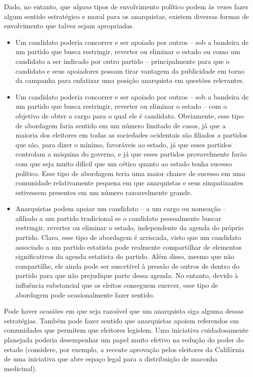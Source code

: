 Dado, no entanto, que \emph{alguns} tipos de envolvimento político podem às vezes fazer algum sentido estratégico e moral para os anarquistas, existem diversas formas de envolvimento que talvez sejam apropriadas.

\begin{itemize}
\item Um candidato poderia concorrer e ser apoiado por outros -- sob a bandeira de um partido que busca restringir, reverter ou eliminar o estado ou como um candidato a ser indicado por outro partido -- principalmente para que o candidato e seus apoiadores possam tirar vantagem da publicidade em torno da campanha para enfatizar uma posição anarquista em questões relevantes.

\item Um candidato poderia concorrer e ser apoiado por outros -- sob a bandeira de um partido que busca restringir, reverter ou eliminar o estado -- com o objetivo de obter o cargo para o qual ele é candidato. Obviamente, esse tipo de abordagem faria sentido em um número limitado de casos, já que a maioria dos eleitores em todas as sociedades ocidentais são filiados a partidos que são, para dizer o mínimo, favoráveis ao estado, já que esses partidos controlam a máquina do governo, e já que esses partidos provavelmente farão com que seja muito difícil que um cético quanto ao estado tenha sucesso político. Esse tipo de abordagem teria uma maior chance de sucesso em uma comunidade relativamente pequena em que anarquistas e seus simpatizantes estivessem presentes em um número razoavelmente grande.

\item Anarquistas podem apoiar um candidato -- a um cargo ou nomeação -- afiliado a um partido tradicional se o candidato pessoalmente buscar restringir, reverter ou eliminar o estado, independente da agenda do próprio partido. Claro, esse tipo de abordagem é arriscada, visto que um candidato associado a um partido estatista pode realmente compartilhar de elementos significativos da agenda estatista do partido. Além disso, mesmo que não compartilhe, ele ainda pode ser suscetível à pressão de outros de dentro do partido para que não prejudique parte dessa agenda. No entanto, devido à influência substancial que os eleitos conseguem exercer, esse tipo de abordagem pode ocasionalmente fazer sentido.
\end{itemize}

Pode haver ocasiões em que seja razoável que um anarquista siga alguma dessas estratégias. Também pode fazer sentido que anarquistas apoiem referendos em comunidades que permitem que eleitores legislem. Uma iniciativa cuidadosamente planejada poderia desempenhar um papel muito efetivo na redução do poder do estado (considere, por exemplo, a recente aprovação pelos eleitores da Califórnia de uma iniciativa que abre espaço legal para a distribuição de maconha medicinal).

